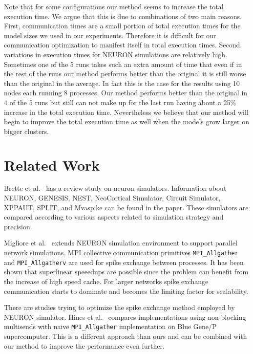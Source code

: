 \documentclass{article}
\begin{document}
Note that for some configurations our method seems to increase the total execution time.
We argue that this is due to combinations of two main reasons.
First, communication times are a small portion of total execution times for the model sizes we used in our experiments.
Therefore it is difficult for our communication optimization to manifest itself in total execution times.
Second, variations in execution times for NEURON simulations are relatively high.
Sometimes one of the 5 runs takes such an extra amount of time that even if in the rest of the runs our method performs better than the original it is still worse than the original in the average.
In fact this is the case for the results using 10 nodes each running 8 processes.
Our method performs better than the original in 4 of the 5 runs but still can not make up for the last run having about a 25\% increase in the total execution time.
Nevertheless we believe that our method will begin to improve the total execution time as well when the models grow larger on bigger clusters.

\section{Related Work}
\label{sec:related-work}

Brette et al.~\cite{brette_simulation_2007} has a review study on neuron simulators.
Information about NEURON, GENESIS, NEST, NeoCortical Simulator, Circuit Simulator, XPPAUT, SPLIT, and Mvaspike can be found in the paper.
These simulators are compared according to various aspects related to simulation strategy and precision.

Migliore et al.~\cite{migliore_parallel_2006} extends NEURON simulation environment to support parallel network simulations.
MPI collective communication primitives \texttt{MPI\_Allgather} and \texttt{MPI\_Allgatherv} are used for spike exchange between processes.
It has been shown that superlinear speeedups are possible since the problem can benefit from the increase of high speed cache.
For larger networks spike exchange communication starts to dominate and becomes the limiting factor for scalability.

There are studies trying to optimize the spike exchange method employed by NEURON simulator.
Hines et al.~\cite{hines_comparison_2011} compares implementations using non-blocking multisends with naive \texttt{MPI\_Allgather} implementation on Blue Gene/P supercomputer.
This is a different approach than ours and can be combined with our method to improve the performance even further.
\end{document}
